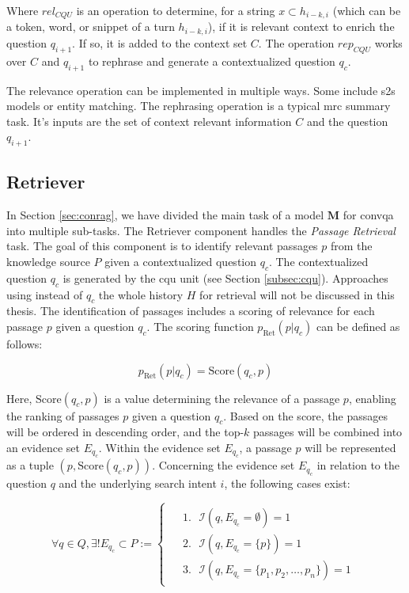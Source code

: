 Where $rel_{CQU}$ is an operation to determine, for a string $x \subset h_{i-k,i}$ (which can be a token, word, or snippet of a turn $h_{i-k,i}$), if it is relevant context to enrich the question $q_{i+1}$. If so, it is added to the context set $C$. The operation $rep_{CQU}$ works over $C$ and $q_{i+1}$ to rephrase and generate a contextualized question $q_c$.

The relevance operation can be implemented in multiple ways. Some include \gls{s2s} models or entity matching. The rephrasing operation is a typical \gls{mrc} summary task. It's inputs are the set of context relevant information $C$ and the question $q_{i+1}$. 

\subsection{Retriever}
\label{subsec:retriever}

In Section \ref{sec:conrag}, we have divided the main task of a model $\mathbf{M}$ for \gls{convqa} into multiple sub-tasks. The Retriever component handles the \textit{Passage Retrieval} task. The goal of this component is to identify relevant passages $p$ from the knowledge source $P$ given a contextualized question $q_c$. The contextualized question $q_c$ is generated by the \gls{cqu} unit (see Section \ref{subsec:cqu}). Approaches using instead of $q_c$ the whole history $H$ for retrieval will not be discussed in this thesis. The identification of passages includes a scoring of relevance for each passage $p$ given a question $q_c$. The scoring function $p_{\text{Ret}}(p|q_c)$ can be defined as follows:

\begin{equation}
    p_{\text{Ret}}(p|q_c) = \text{Score}(q_c,p)
    \label{eq:retriever}
\end{equation}

Here, $\text{Score}(q_c,p)$ is a value determining the relevance of a passage $p$, enabling the ranking of passages $p$ given a question $q_c$. Based on the score, the passages will be ordered in descending order, and the top-$k$ passages will be combined into an evidence set $E_{q_c}$. Within the evidence set $E_{q_c}$, a passage $p$ will be represented as a tuple $(p, \text{Score}(q_c,p))$. Concerning the evidence set $E_{q_c}$ in relation to the question $q$ and the underlying search intent $i$, the following cases exist:

\begin{equation}
    \forall q \in Q, \exists! E_{q_c} \subset P  := 
    \begin{cases}
        \begin{aligned}
            &1. \text{ } \mathcal{I}(q,E_{q_c} = \emptyset) = 1 \\
            &2. \text{ } \mathcal{I}(q,E_{q_c} = \{p\}) = 1 \\
            &3. \text{ } \mathcal{I}(q,E_{q_c} = \{p_1, p_2, \dots, p_n\}) = 1
        \end{aligned}
    \end{cases}
    \label{eq:evidence_cases}
\end{equation}

